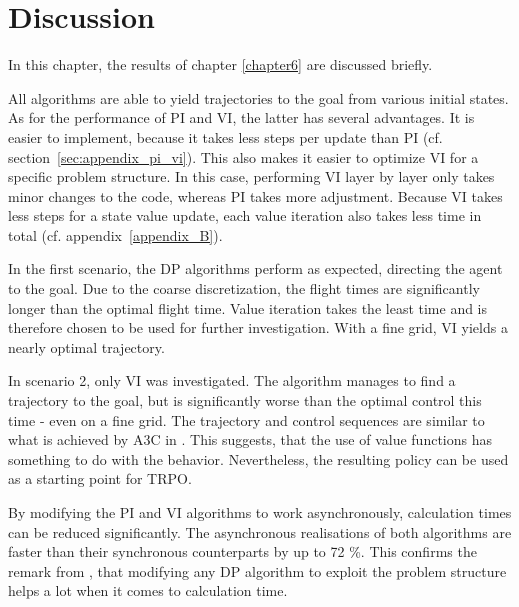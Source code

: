 \chapter{Discussion}
\label{chapter7}
In this chapter, the results of chapter \ref{chapter6} are discussed briefly.

All algorithms are able to yield trajectories to the goal from various initial states. As for the performance of PI and VI, the latter has several advantages. It is easier to implement, because it takes less steps per update than PI (cf. section~\ref{sec:appendix_pi_vi}). This also makes it easier to optimize VI for a specific problem structure. In this case, performing VI layer by layer only takes minor changes to the code, whereas PI takes more adjustment. Because VI takes less steps for a state value update, each value iteration also takes less time in total (cf. appendix~\ref{appendix_B}).

In the first scenario, the DP algorithms perform as expected, directing the agent to the goal. Due to the coarse discretization, the flight times are significantly longer than the optimal flight time. Value iteration takes the least time and is therefore chosen to be used for further investigation. With a fine grid, VI yields a nearly optimal trajectory.

In scenario 2, only VI was investigated. The algorithm manages to find a trajectory to the goal, but is significantly worse than the optimal control this time - even on a fine grid. The trajectory and control sequences are similar to what is achieved by A3C in \cite{Zuern2017}. This suggests, that the use of value functions has something to do with the behavior. Nevertheless, the resulting policy can be used as a starting point for TRPO.

By modifying the PI and VI algorithms to work asynchronously, calculation times can be reduced significantly. The asynchronous realisations of both algorithms are faster than their synchronous counterparts by up to 72 \%. This confirms the remark from \cite{Powell2007ADP}, that modifying any DP algorithm to exploit the problem structure helps a lot when it comes to calculation time.


